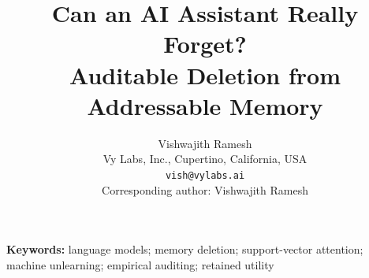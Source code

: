 \documentclass[11pt,a4paper]{article}
\title{Can an AI Assistant Really Forget?\\Auditable Deletion from Addressable Memory}
\author{Vishwajith Ramesh\\Vy Labs, Inc., Cupertino, California, USA\\\texttt{vish@vylabs.ai}\\Corresponding author: Vishwajith Ramesh}
\date{}
\theoremstyle{definition}
\begin{document}
\maketitle
\begin{abstract}

\end{abstract}
\noindent\textbf{Keywords:} language models; memory deletion; support-vector attention; machine unlearning; empirical auditing; retained utility

\begingroup
\small


\endgroup
\clearpage
\appendix

\end{document}
